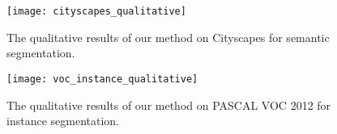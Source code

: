\documentclass{article}
\begin{document}
\begin{figure}[t!]
\centering
\texttt{[image: cityscapes\_qualitative]}
\caption{The qualitative results of our method on Cityscapes for semantic segmentation.}
\label{fig:cityscapes_qualitative}
\end{figure}


\begin{figure}[t!]
\centering
\texttt{[image: voc\_instance\_qualitative]}
\caption{The qualitative results of our method on PASCAL VOC 2012 for instance segmentation.}
\label{fig:voc_instance_qualitative}
\end{figure}









\small
\newpage


\end{document}
